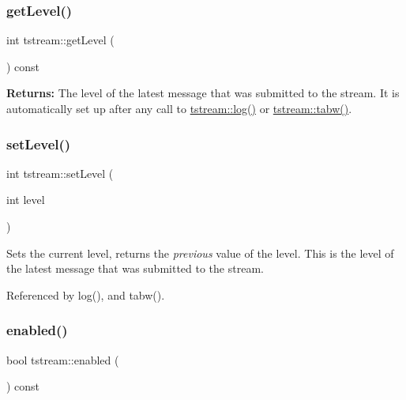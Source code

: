 \subsubsection{\texorpdfstring{get\+Level()}{getLevel()}}
{\footnotesize\ttfamily int tstream\+::get\+Level (\begin{DoxyParamCaption}{ }\end{DoxyParamCaption}) const\hspace{0.3cm}{\ttfamily [inline]}}

{\bfseries Returns\+:} The level of the latest message that was submitted to the stream. It is automatically set up after any call to \mbox{\hyperlink{clasststream_a1fe9745dc492e891a6e765e34fa082c3}{tstream\+::log()}} or \mbox{\hyperlink{clasststream_a5aa7a21d7b95f1bf40e68b5b13118fd0}{tstream\+::tabw()}}. \mbox{\label{clasststream_a37fa7894d7ae83674ee7cb5a69a4c4a5}} 
\subsubsection{\texorpdfstring{set\+Level()}{setLevel()}}
{\footnotesize\ttfamily int tstream\+::set\+Level (\begin{DoxyParamCaption}\item[{int}]{level }\end{DoxyParamCaption})\hspace{0.3cm}{\ttfamily [inline]}}

Sets the current level, returns the {\itshape previous} value of the level. This is the level of the latest message that was submitted to the stream. 

Referenced by log(), and tabw().

\mbox{\label{clasststream_a01303d5c2c5cd83d06985622ca50d77b}} 
\subsubsection{\texorpdfstring{enabled()}{enabled()}\hspace{0.1cm}{\footnotesize\ttfamily [1/2]}}
{\footnotesize\ttfamily bool tstream\+::enabled (\begin{DoxyParamCaption}{ }\end{DoxyParamCaption}) const\hspace{0.3cm}{\ttfamily [inline]}}

